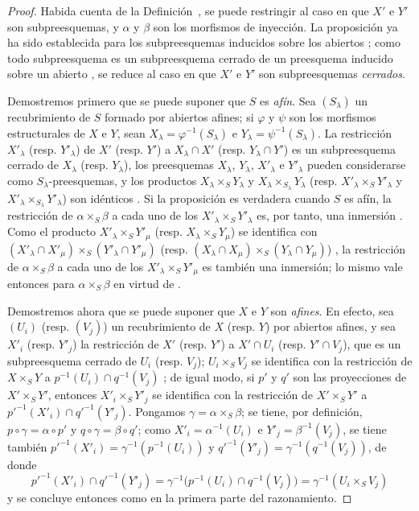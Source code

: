 \documentclass[oneside]{amsart}
\theoremstyle{ega-env-style}
\theoremstyle{ega-thm-env-style}
\theoremstyle{ega-defn-env-style}
\newcommand{\oldpage}[2][]{{\marginnote{\normalfont{\textbf{#1}~|~#2}}}\ignorespaces}
\begin{document}
\begin{proof}
Habida cuenta de la Definición~, se puede restringir al caso en que $X'$ e $Y'$ son subpreesquemas, y $\alpha$ y $\beta$ son los morfismos de inyección.
La proposición ya ha sido establecida para los subpreesquemas inducidos sobre los abiertos ;
como todo subpreesquema es un subpreesquema cerrado de un preesquema inducido sobre un abierto , se reduce al caso en que $X'$ e $Y'$ son subpreesquemas \emph{cerrados}.

Demostremos primero que se puede suponer que $S$ es \emph{afín}.
Sea $(S_\lambda)$ un recubrimiento de $S$ formado por abiertos afines;
si $\varphi$ y $\psi$ son los morfismos estructurales de $X$ e $Y$, sean $X_\lambda=\varphi^{-1}(S_\lambda)$ e $Y_\lambda=\psi^{-1}(S_\lambda)$.
La restricción $X'_\lambda$ (resp. $Y'_\lambda$) de $X'$ (resp. $Y'$) a $X_\lambda\cap X'$ (resp. $Y_\lambda\cap Y'$) es un subpreesquema cerrado de $X_\lambda$ (resp. $Y_\lambda$), los preesquemas $X_\lambda$, $Y_\lambda$, $X'_\lambda$ e $Y'_\lambda$ pueden considerarse como $S_\lambda$-preesquemas, y los productos $X_\lambda\times_S Y_\lambda$ y $X_\lambda\times_{S_\lambda}Y_\lambda$ (resp. $X'_\lambda\times_S Y'_\lambda$ y $X'_\lambda\times_{S_\lambda}Y'_\lambda$) son idénticos .
Si la proposición es verdadera cuando $S$ es afín, la restricción de $\alpha\times_S\beta$ a cada uno de los $X'_\lambda\times_S Y'_\lambda$ es, por tanto, una inmersión .
Como el producto $X'_\lambda\times_S Y'_\mu$ (resp. $X_\lambda\times_S Y_\mu$) se identifica con $(X'_\lambda\cap X'_\mu)\times_S(Y'_\lambda\cap Y'_\mu)$ (resp. $(X_\lambda\cap X_\mu)\times_S(Y_\lambda\cap Y_\mu)$) , la restricción de $\alpha\times_S\beta$
\oldpage[I]{125}
a cada uno de los $X'_\lambda\times_S Y'_\mu$ es también una inmersión;
lo mismo vale entonces para $\alpha\times_S\beta$ en virtud de .

Demostremos ahora que se puede suponer que $X$ e $Y$ son \emph{afines}.
En efecto, sea $(U_i)$ (resp. $(V_j)$) un recubrimiento de $X$ (resp. $Y$) por abiertos afines, y sea $X'_i$ (resp. $Y'_j$) la restricción de $X'$ (resp. $Y'$) a $X'\cap U_i$ (resp. $Y'\cap V_j$), que es un subpreesquema cerrado de $U_i$ (resp. $V_j$);
$U_i\times_S V_j$ se identifica con la restricción de $X\times_S Y$ a $p^{-1}(U_i)\cap q^{-1}(V_j)$ ;
de igual modo, si $p'$ y $q'$ son las proyecciones de $X'\times_S Y'$, entonces $X'_i\times_S Y'_j$ se identifica con la restricción de $X'\times_S Y'$ a ${p'}^{-1}(X'_i)\cap{q'}^{-1}(Y'_j)$.
Pongamos $\gamma=\alpha\times_S\beta$;
se tiene, por definición, $p\circ\gamma=\alpha\circ p'$ y $q\circ\gamma=\beta\circ q'$;
como $X'_i=\alpha^{-1}(U_i)$ e $Y'_j=\beta^{-1}(V_j)$, se tiene también ${p'}^{-1}(X'_i)=\gamma^{-1}(p^{-1}(U_i))$ y ${q'}^{-1}(Y'_j)=\gamma^{-1}(q^{-1}(V_j))$, de donde
\[
  {p'}^{-1}(X'_i)\cap{q'}^{-1}(Y'_j)
  =\gamma^{-1}\bigl(p^{-1}(U_i)\cap q^{-1}(V_j)\bigr)
  =\gamma^{-1}(U_i\times_S V_j)
\]
y se concluye entonces como en la primera parte del razonamiento.


\end{proof}
\end{document}

